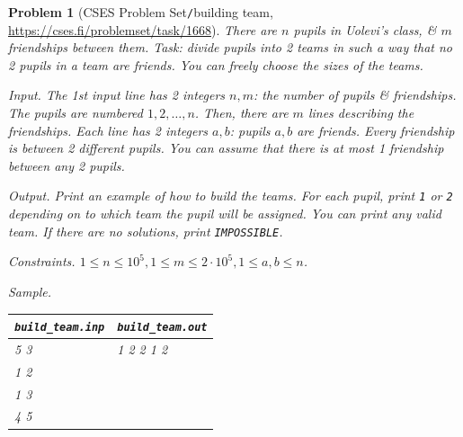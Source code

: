 \documentclass[oneside]{book}
\newtheorem{problem}{Problem}
\begin{document}
\begin{problem}[CSES Problem Set{\tt/}building team, \url{https://cses.fi/problemset/task/1668}]
	There are $n$ pupils in Uolevi's class, \& $m$ friendships between them. Task: divide pupils into 2 teams in such a way that no 2 pupils in a team are friends. You can freely choose the sizes of the teams.
	\item {\sf Input.} The 1st input line has 2 integers $n,m$: the number of pupils \& friendships. The pupils are numbered $1,2,\ldots,n$. Then, there are $m$ lines describing the friendships. Each line has 2 integers $a,b$: pupils $a,b$ are friends. Every friendship is between 2 different pupils. You can assume that there is at most 1 friendship between any 2 pupils.
	\item {\sf Output.} Print an example of how to build the teams. For each pupil, print {\tt1} or {\tt2} depending on to which team the pupil will be assigned. You can print any valid team. If there are no solutions, print {\tt IMPOSSIBLE}.
	\item {\sf Constraints.} $1\le n\le10^5,1\le m\le2\cdot10^5,1\le a,b\le n$.
	\item {\sf Sample.}
	\begin{table}[H]
		\centering
		\begin{tabular}{|l|l|}
			\hline
			\verb|build_team.inp| & \verb|build_team.out| \\
			\hline
			5 3 & 1 2 2 1 2 \\
			1 2 & \\
			1 3 & \\
			4 5 & \\
			\hline
		\end{tabular}
	\end{table}
\end{problem}
\end{document}
